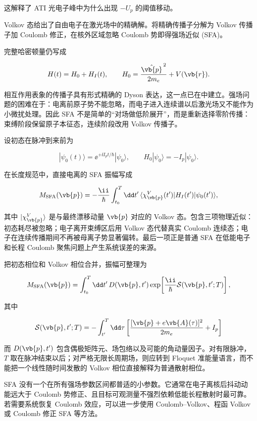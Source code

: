 这解释了 ATI 光电子峰中为什么出现 \(-U_p\) 的阈值移动。

Volkov 态给出了自由电子在激光场中的精确解。将精确传播子分解为 Volkov 传播子加 Coulomb 修正，在核外区域忽略 Coulomb 势即得强场近似 (SFA)。

完整哈密顿量仍写成

\[
H(t)=H_0+H_I(t),
\qquad
H_0=\frac{\hat{\vb{p}}^{\,2}}{2m_e}+V(\vb{r}).
\]

相互作用表象的传播子具有形式精确的 Dyson 表达，这一点已在中建立。强场问题的困难在于：电离前原子势不能忽略，而电子进入连续谱以后激光场又不能作为小微扰处理。因此 SFA 不是简单的“对场做低阶展开”，而是重新选择零阶传播：束缚阶段保留原子本征态，连续阶段改用 Volkov 传播子。

设初态在脉冲到来前为

\[
|\psi_0(t)\rangle=\ee^{+\ii I_p t/\hbar}|\psi_0\rangle,
\qquad H_0|\psi_0\rangle=-I_p|\psi_0\rangle.
\]

在长度规范中，直接电离的 SFA 振幅写成

\begin{equation}
M_{\rm SFA}(\vb{p})
=-\frac{\ii}{\hbar}\int_{t_0}^{T}\dd t'
\,\langle\chi_{\vb{p}}^{V}(t')|
H_I(t')|\psi_0(t')\rangle,
\label{eq:sfa-direct-amplitude}
\end{equation}

其中 \(|\chi_{\vb{p}}^{V}\rangle\) 是与最终漂移动量 \(\vb{p}\) 对应的 Volkov 态。包含三项物理近似：初态耗尽被忽略；电子离开束缚区后用 Volkov 态代替真实 Coulomb 连续态；电子在连续传播期间不再被母离子势显著偏转。最后一项正是普通 SFA 在低能电子和长程 Coulomb 聚焦问题上产生系统误差的来源。

把初态相位和 Volkov 相位合并，振幅可整理为

\[
M_{\rm SFA}(\vb{p})
=\int_{t_0}^{T}\dd t'\,
D(\vb{p},t')
\exp\!\left[\frac{\ii}{\hbar}\mathcal S(\vb{p},t';T)\right],
\]

其中

\begin{equation}
\mathcal S(\vb{p},t';T)
=-\int_{t'}^{T}\dd\tau
\left[
\frac{[\vb{p}+e\vb{A}(\tau)]^2}{2m_e}+I_p
\right]
\label{eq:sfa-action}
\end{equation}

而 \(D(\vb{p},t')\) 包含偶极矩阵元、场包络以及可能的角动量因子。对有限脉冲，\(T\) 取在脉冲结束以后；对严格无限长周期场，则应转到 Floquet 准能量语言，而不能把一个线性随时间发散的 Volkov 相位直接解释为普通散射相位。

SFA 没有一个在所有强场参数区间都普适的小参数。它通常在电子离核后抖动动能远大于 Coulomb 势修正、且目标可观测量不强烈依赖低能长程散射时最可靠。若需要系统恢复 Coulomb 效应，可以进一步使用 Coulomb--Volkov、程函 Volkov 或 Coulomb 修正 SFA 等方法。

